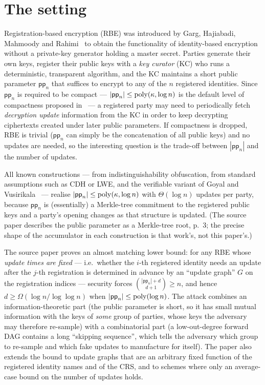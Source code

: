 \documentclass{aicr-conjecture}
\newcommand{\pp}{\mathsf{pp}}
\begin{document}
\section{The setting}\label{sec:setting}

Registration-based encryption (RBE) was introduced by Garg, Hajiabadi,
Mahmoody and Rahimi~\cite{GHMR18} to obtain the functionality of
identity-based encryption without a private-key generator holding a
master secret. Parties generate their own keys, register their public
keys with a \emph{key curator} (KC) who runs a deterministic,
transparent algorithm, and the KC maintains a short public parameter
$\pp_n$ that suffices to encrypt to any of the $n$ registered
identities. Since $\pp_n$ is required to be compact ---
$|\pp_n| \le \poly(\kappa,\log n)$ is the default level of compactness
proposed in~\cite{GHMR18} --- a registered party may need to
periodically fetch \emph{decryption update} information from the KC in
order to keep decrypting ciphertexts created under later public
parameters. If compactness is dropped, RBE is trivial ($\pp_n$ can
simply be the concatenation of all public keys) and no updates are
needed, so the interesting question is the trade-off between $|\pp_n|$
and the number of updates.

All known constructions --- \cite{GHMR18} from indistinguishability
obfuscation, \cite{GHM19} from standard assumptions such as CDH or LWE,
and the verifiable variant of Goyal and Vusirikala~\cite{GV20} ---
realise $|\pp_n| \le \poly(\kappa,\log n)$ with $\Theta(\log n)$ updates
per party, because $\pp_n$ is (essentially) a Merkle-tree commitment to
the registered public keys and a party's opening changes as that
structure is updated. (The source paper describes the public parameter
as a Merkle-tree root, p.~3; the precise shape of the accumulator in
each construction is that work's, not this paper's.)

The source paper proves an almost matching lower bound: for any RBE
whose \emph{update times are fixed} --- i.e.\ whether the $i$-th
registered identity needs an update after the $j$-th registration is
determined in advance by an ``update graph'' $G$ on the registration
indices --- security forces $\binom{|\pp_n| + d}{d+1} \ge n$, and hence
$d \ge \Omega(\log n/\log\log n)$ when $|\pp_n| \le \poly(\log n)$. The
attack combines an information-theoretic part (the public parameter is
short, so it has small mutual information with the keys of \emph{some}
group of parties, whose keys the adversary may therefore re-sample) with
a combinatorial part (a low-out-degree forward DAG contains a long
``skipping sequence'', which tells the adversary which group to
re-sample and which fake updates to manufacture for itself). The paper
also extends the bound to update graphs that are an arbitrary fixed
function of the registered identity names and of the CRS, and to schemes
where only an average-case bound on the number of updates holds.
\end{document}
